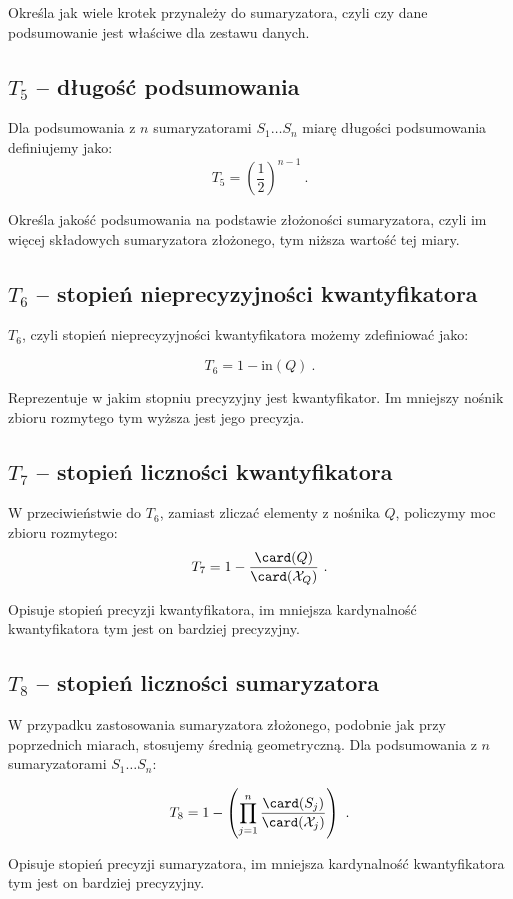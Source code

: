 \documentclass{classrep}
\begin{document}
 Określa jak wiele krotek przynależy do sumaryzatora, czyli czy dane podsumowanie jest właściwe dla zestawu danych.

\subsection{\(T_5\) -- długość podsumowania}
Dla podsumowania z \(n\) sumaryzatorami \(S_1 \ldots S_n\)
miarę długości podsumowania definiujemy jako:
\[T_5 = \left(\frac{1}{2}\right)^{n-1} ~\mbox{.}\]

Określa jakość podsumowania na podstawie złożoności sumaryzatora, czyli im więcej składowych sumaryzatora złożonego, tym niższa wartość tej miary.

\subsection{\(T_6\) -- stopień nieprecyzyjności kwantyfikatora}
\(T_6\), czyli stopień nieprecyzyjności kwantyfikatora możemy zdefiniować jako:

\[T_6 = 1-\mathrm{in}(Q) ~\mbox{.}\]

Reprezentuje w jakim stopniu precyzyjny jest kwantyfikator. Im mniejszy nośnik zbioru rozmytego tym wyższa jest jego precyzja.

\subsection{\(T_7\) -- stopień liczności kwantyfikatora}
W przeciwieństwie do \(T_6\), zamiast zliczać elementy z nośnika \(Q\),
policzymy moc zbioru rozmytego:
\[T_7 = 1-\frac{\card(Q)}{\card(\mathcal{X}_Q)} ~\mbox{.}\]

Opisuje stopień precyzji kwantyfikatora, im mniejsza kardynalność kwantyfikatora tym jest on bardziej precyzyjny.

\subsection{\(T_8\) -- stopień liczności sumaryzatora}
W przypadku zastosowania sumaryzatora złożonego, podobnie jak przy poprzednich miarach, stosujemy średnią geometryczną.
Dla podsumowania z \(n\) sumaryzatorami \(S_1 \ldots S_n\):

\[T_8 = 1- \left(\prod_{j=1}^{n} \frac{\card(S_j)}{\card(\mathcal{X}_j)}\right) ~\mbox{.}\]

Opisuje stopień precyzji sumaryzatora, im mniejsza kardynalność kwantyfikatora tym jest on bardziej precyzyjny.
\end{document}
